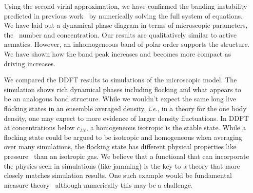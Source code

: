 Using the second virial approximation, we have confirmed the banding instability
predicted in previous
work~\cite{baskaran_hydrodynamics_08,baskaran_selfregulation_12} by numerically
solving the full system of equations. We have laid out a dynamical phase diagram
in terms of microscopic parameters, the \peclet~number and concentration. Our
results are qualitatively similar to active nematics.  However, an inhomogeneous
band of polar order supports the structure. We have shown how the band peak
increases and becomes more compact as driving increases.   

We compared the DDFT results to simulations of the microscopic model. The
simulation shows rich dynamical phases including flocking and what appears to be
an analogous band structure. While we wouldn't expect the same long live
flocking states in an ensemble averaged density, \textit{i.e.}, in a theory for
the one body density, one may expect to more evidence of larger density
fluctuations. In DDFT at concentrations below $c_{IN}$, a homogeneous isotropic
is the stable state. While a flocking state could be argued to be isotropic and
homogeneous when averaging over many simulations, the flocking state has
different physical properties like pressure~\cite{kuan_hysteresis_15} than an
isotropic gas.  We believe that a functional that can incorporate the physics
seen in simulations (like jamming) is the key to a theory that more closely
matches simulation results.  One such example would be fundamental measure
theory~\cite{rosenfeld_freeenergy_90} although numerically this may be a
challenge.

